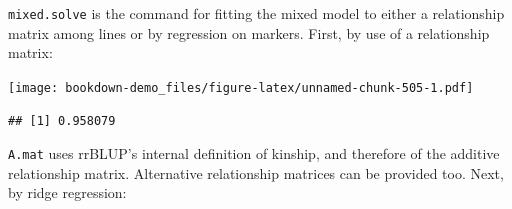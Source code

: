 \documentclass[
]{book}
\newenvironment{Shaded}{\begin{snugshade}}{\end{snugshade}}
\newcommand{\AttributeTok}[1]{\textcolor[rgb]{0.77,0.63,0.00}{#1}}
\newcommand{\ConstantTok}[1]{\textcolor[rgb]{0.00,0.00,0.00}{#1}}
\newcommand{\DecValTok}[1]{\textcolor[rgb]{0.00,0.00,0.81}{#1}}
\newcommand{\FloatTok}[1]{\textcolor[rgb]{0.00,0.00,0.81}{#1}}
\newcommand{\FunctionTok}[1]{\textcolor[rgb]{0.00,0.00,0.00}{#1}}
\newcommand{\NormalTok}[1]{#1}
\newcommand{\OtherTok}[1]{\textcolor[rgb]{0.56,0.35,0.01}{#1}}
\newcommand{\SpecialCharTok}[1]{\textcolor[rgb]{0.00,0.00,0.00}{#1}}
\newcommand{\StringTok}[1]{\textcolor[rgb]{0.31,0.60,0.02}{#1}}
\begin{document}
\texttt{mixed.solve} is the command for fitting the mixed model to either a relationship matrix
among lines or by regression on markers. First, by use of a relationship matrix:

\begin{Shaded}
\end{Shaded}

\texttt{[image: bookdown-demo\_files/figure-latex/unnamed-chunk-505-1.pdf]}

\begin{Shaded}
\end{Shaded}

\begin{verbatim}
## [1] 0.958079
\end{verbatim}

\texttt{A.mat} uses rrBLUP's internal definition of kinship, and therefore of the additive relationship matrix. Alternative relationship matrices can be provided too. Next, by ridge regression:

\begin{Shaded}
\end{Shaded}
\end{document}
